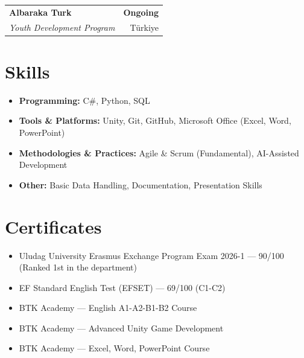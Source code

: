 \documentclass[a4paper,12pt]{article}
\begin{document}
\vspace{8pt} 

\begin{tabularx}{\linewidth}{@{}X r@{}}
\textbf{Albaraka Turk} & \textbf{Ongoing} \\
\textit{Youth Development Program} & Türkiye \\
\end{tabularx}

\vspace{10pt}

\section{Skills}
\begin{itemize}[nosep,after=\strut, leftmargin=1.5em, itemsep=6pt,label=\textbullet]
    \item \textbf{Programming:} C\#, Python, SQL
    \item \textbf{Tools \& Platforms:} Unity, Git, GitHub, Microsoft Office (Excel, Word, PowerPoint)
    \item \textbf{Methodologies \& Practices:} Agile \& Scrum (Fundamental), AI-Assisted Development
    \item \textbf{Other:} Basic Data Handling, Documentation, Presentation Skills
\end{itemize}

\vspace{10pt}

\section{Certificates}
\begin{itemize}[nosep,after=\strut, leftmargin=1.5em, itemsep=6pt,label=\textbullet]
    \item Uludag University Erasmus Exchange Program Exam 2026-1 --- 90/100 (Ranked 1st in the department)
    \item EF Standard English Test (EFSET) --- 69/100 (C1-C2)
    \item BTK Academy --- English A1-A2-B1-B2 Course
    \item BTK Academy --- Advanced Unity Game Development
    \item BTK Academy --- Excel, Word, PowerPoint Course
\end{itemize}
\end{document}
